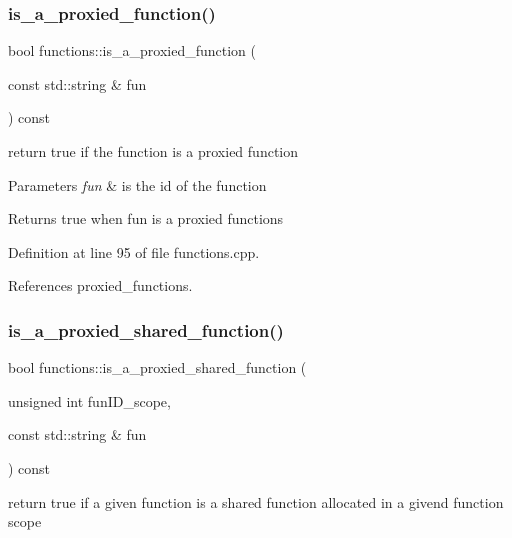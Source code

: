 \subsubsection{\texorpdfstring{is\+\_\+a\+\_\+proxied\+\_\+function()}{is\_a\_proxied\_function()}}
{\footnotesize\ttfamily bool functions\+::is\+\_\+a\+\_\+proxied\+\_\+function (\begin{DoxyParamCaption}\item[{const std\+::string \&}]{fun }\end{DoxyParamCaption}) const}



return true if the function is a proxied function 


\begin{DoxyParams}{Parameters}
{\em fun} & is the id of the function \\
\hline
\end{DoxyParams}
\begin{DoxyReturn}{Returns}
true when fun is a proxied functions 
\end{DoxyReturn}


Definition at line 95 of file functions.\+cpp.



References proxied\+\_\+functions.

\mbox{\label{classfunctions_ab0dc3920fb572cb4fb7da178bf285619}} 
\subsubsection{\texorpdfstring{is\+\_\+a\+\_\+proxied\+\_\+shared\+\_\+function()}{is\_a\_proxied\_shared\_function()}}
{\footnotesize\ttfamily bool functions\+::is\+\_\+a\+\_\+proxied\+\_\+shared\+\_\+function (\begin{DoxyParamCaption}\item[{unsigned int}]{fun\+I\+D\+\_\+scope,  }\item[{const std\+::string \&}]{fun }\end{DoxyParamCaption}) const}



return true if a given function is a shared function allocated in a givend function scope 


